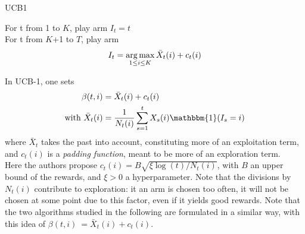 \begin{algorithm}
    \caption{UCB1}
	\label{alg:ucb1}
    For t from 1 to $K$, play arm $I_t = t$ \\
    For t from $K$+1 to $T$, play arm 
    $$ I_t = \operatorname*{arg\,max}_{1\leq i \leq K} \bar X_t(i) + c_t(i)$$
\end{algorithm}

In UCB-1, one sets 
\begin{align}
\beta(t,i)& =\bar{X}_t(i)+c_t(i)\\
\text{with } \bar{X}_t(i) &= \frac{1}{N_t(i)}\sum_{s=1}^t X_s(i)\mathbbm{1}(I_s=i)
\end{align}
where $\bar{X}_t$ takes the past into account, constituting more of an exploitation term, and $c_t(i)$ is a \textit{padding function}, meant to be more of an exploration term.\\
Here the authors propose $c_t(i)=B\sqrt{\xi \log(t)/N_t(i)}$, with $B$ an upper bound of the rewards, and $\xi>0$ a hyperparameter.
Note that the divisions by $N_t(i)$ contribute to exploration: it an arm is chosen too often, it will not be chosen at some point due to this factor, even if it yields good rewards.
Note that the two algorithms studied in the following are formulated in a similar way, with this idea of $\beta(t,i)\ =\bar{X}_t(i)+c_t(i)$.